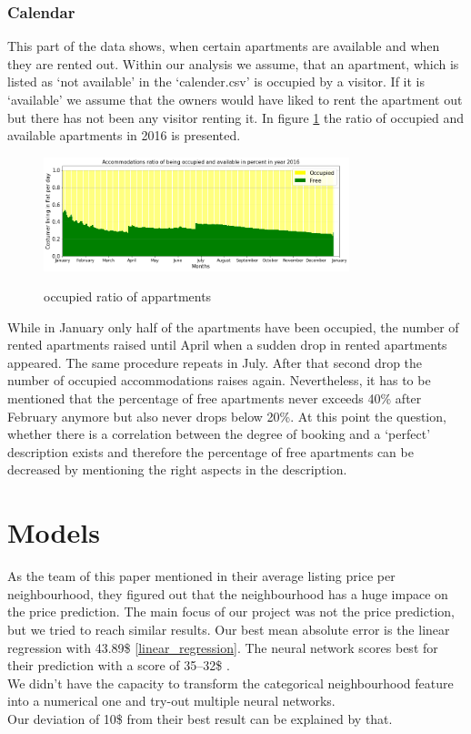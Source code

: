 \subsubsection{Calendar}
This part of the data shows, when certain apartments are available and when they are rented out. Within our analysis we assume, that an apartment, which is listed as ‘not available’ in the ‘calender.csv’ is occupied by a visitor. If it is ‘available’ we assume that the owners would have liked to rent the apartment out but there has not been any visitor renting it. In figure \ref{occupied_ratio_appartments} the ratio of occupied and available apartments in 2016 is presented.
%
\begin{figure}
  \begin{center}
  \includegraphics[width=3.5in]{photo/11_acc_ratio_occupied.png}\\
  \caption{occupied ratio of appartments}\label{occupied_ratio_appartments}
  \end{center}
\end{figure}
%
While in January only half of the apartments have been occupied, the number of rented apartments raised until April when a sudden drop in rented apartments appeared. The same procedure repeats in July. After that second drop the number of occupied accommodations raises again. Nevertheless, it has to be mentioned that the percentage of free apartments never exceeds 40\% after February anymore but also never drops below 20\%. At this point the question, whether there is a correlation between the degree of booking and a ‘perfect’ description exists and therefore the percentage of free apartments can be decreased by mentioning the right aspects in the description. 

\section{Models}

As the team of this paper \cite{RN1} mentioned in their average listing price per neighbourhood, they figured out that the neighbourhood has a huge impace on the price prediction. The main focus of our project was not the price prediction, but we tried to reach similar results. Our best mean absolute error is the linear regression with 43.89\$ \ref{linear_regression}. The neural network scores best for their prediction with a score of 35–32\$ \cite{RN1}. \\
We didn't have the capacity to transform the categorical neighbourhood feature into a numerical one and try-out multiple neural networks. \\
Our deviation of 10\$ from their best result can be explained by that.

